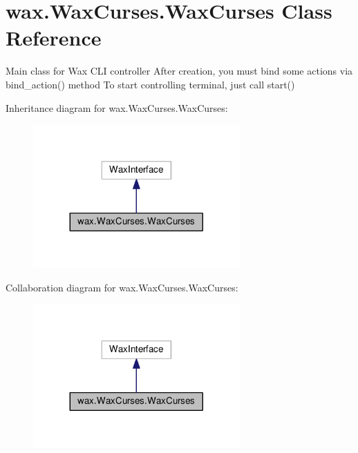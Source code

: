 \hypertarget{classwax_1_1WaxCurses_1_1WaxCurses}{}\section{wax.\+Wax\+Curses.\+Wax\+Curses Class Reference}
\label{classwax_1_1WaxCurses_1_1WaxCurses}


Main class for Wax C\+LI controller After creation, you must bind some actions via bind\+\_\+action() method To start controlling terminal, just call start()  




Inheritance diagram for wax.\+Wax\+Curses.\+Wax\+Curses\+:
\nopagebreak
\begin{figure}[H]
\begin{center}
\leavevmode
\includegraphics[width=224pt]{classwax_1_1WaxCurses_1_1WaxCurses__inherit__graph}
\end{center}
\end{figure}


Collaboration diagram for wax.\+Wax\+Curses.\+Wax\+Curses\+:
\nopagebreak
\begin{figure}[H]
\begin{center}
\leavevmode
\includegraphics[width=224pt]{classwax_1_1WaxCurses_1_1WaxCurses__coll__graph}
\end{center}
\end{figure}
